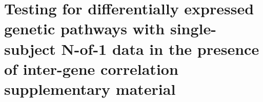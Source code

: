 \chapter{Testing for differentially expressed genetic pathways with single-subject N-of-1 data in the presence of inter-gene correlation supplementary material}

